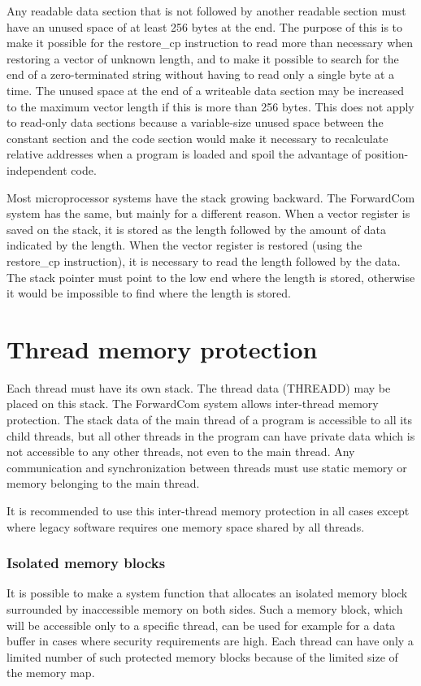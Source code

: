 \documentclass[forwardcom.tex]{subfiles}
\begin{document}
\label{extraSpaceAtEndOfData}
Any readable data section that is not followed by another readable section must have an unused space of at least 256 bytes at the end. The purpose of this is to make it possible for the restore\_cp instruction to read more than necessary when restoring a vector of unknown length, and to make 
it possible to search for the end of a zero-terminated string without having to read only a single byte at a time. The unused space at the end of a writeable data section may be increased to the maximum vector length if this is more than 256 bytes. This does not apply to read-only data sections because a variable-size unused space between the constant section and the code section would make it necessary to recalculate relative addresses when a program is loaded and spoil the advantage of position-independent code.
\vspace{2mm}

Most microprocessor systems have the stack growing backward. The ForwardCom system has the same, but mainly for a different reason. When a vector register is saved on the stack, it is stored as the length followed by the amount of data indicated by the length. When the vector register is restored (using the restore\_cp instruction), it is necessary to read the length followed by the data. The stack pointer must point to the low end where the length is stored, otherwise it would be impossible to find where the length is stored. 

\section{Thread memory protection} \label{threadMemoryProtection}
Each thread must have its own stack. The thread data (THREADD) may be placed on this stack. The ForwardCom system allows inter-thread memory protection. The stack data of the main thread of a program is accessible to all its child threads, but all other threads in the program can have private data which is not accessible to any other threads, not even to the main thread. Any communication and synchronization between threads must use static memory or memory belonging to the main thread. 
\vspace{2mm}

It is recommended to use this inter-thread memory protection in all cases except where legacy software requires one memory space shared by all threads. 
\vspace{2mm}

\subsubsection{Isolated memory blocks} \label{isolatedMemoryBlocks}
It is possible to make a system function that allocates an isolated memory block surrounded by inaccessible memory on both sides. Such a memory block, which will be accessible only to a specific thread, can be used for example for a data buffer in cases where security requirements are high. Each thread can have only a limited number of such protected memory blocks because of the limited size of the memory map.
\end{document}
